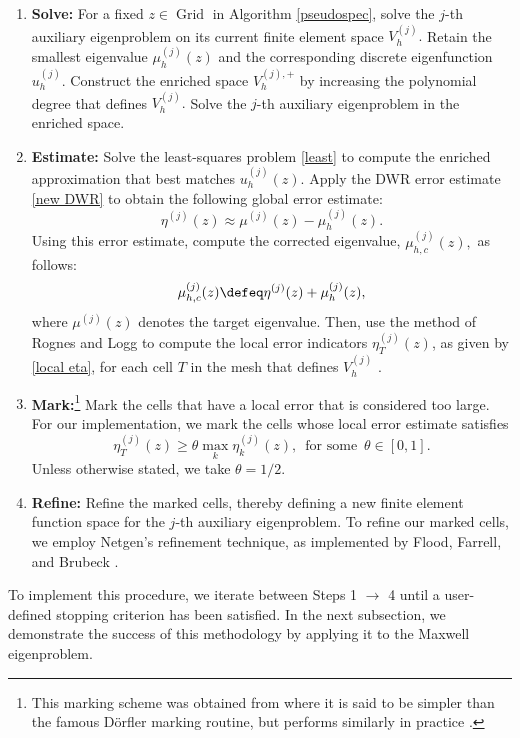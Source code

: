 \begin{enumerate}[label=\textbf{\arabic*}.] 
    \item \textbf{Solve:} For a fixed $z \in \operatorname{Grid}$ in Algorithm \ref{pseudospec},
    solve the $j$-th auxiliary eigenproblem on its current finite element space $V_h^{(j)}.$ Retain the smallest eigenvalue $\mu_h^{(j)}(z)$ and the corresponding discrete eigenfunction $u_h^{(j)}.$ Construct the enriched space $V_h^{(j), +}$ by increasing the polynomial degree that defines $V_h^{(j)}.$ Solve the $j$-th auxiliary eigenproblem in the enriched space.
    
    \item \textbf{Estimate:} Solve the least-squares problem \eqref{least} to compute the enriched approximation that best matches $u_h^{(j)}(z).$ Apply the DWR error estimate \eqref{new DWR} to obtain the following global error estimate:
    \begin{equation}
        \eta^{(j)}(z) \approx  \mu^{(j)}(z) - \mu_h^{(j)}(z).
    \end{equation}
    Using this error estimate, compute the corrected eigenvalue, $\mu_{h,c}^{(j)}(z),$  as follows:
    \begin{equation}
        \mu_{h,c}^{(j)}(z) \defeq \eta^{(j)}(z) + \mu_h^{(j)}(z),
    \end{equation}
    where $\mu^{(j)}(z)$ denotes the target eigenvalue. 
   Then, use the method of Rognes and Logg to compute the local error indicators $\eta_T^{(j)}(z)$, as given by \eqref{local eta}, for each cell $T$ in the mesh that defines $V_h^{(j)}$ \cite{logg, joe, pablo}. 

    
    \item \textbf{Mark:}\footnote{This marking scheme was obtained from \cite{Pslides} where it is said to be simpler than the famous Dörfler marking routine, but performs similarly in practice \cite{Dorf, Pslides}.} 
    Mark the cells that have a local error that is considered too large. For our implementation, we mark the cells whose local error estimate satisfies
    \begin{equation} \label{mark}
        \eta_T^{(j)}(z) \ge \theta \max_{k} \eta_k^{(j)}(z), \, \text{ for some } \, \theta \in [0,1].
    \end{equation}
    Unless otherwise stated, we take $\theta = 1/2.$

    
    \item \textbf{Refine:} Refine the marked cells, thereby defining a new finite element function space for the $j$-th auxiliary eigenproblem. To refine our marked cells, we employ Netgen's refinement technique, as implemented by Flood, Farrell, and Brubeck \cite{NGSolve, Schoberl1997, pablo}.

\end{enumerate}
To implement this procedure, we iterate between Steps 1 $\rightarrow$ 4 until a user-defined stopping criterion has been satisfied. In the next subsection, we demonstrate the success of this methodology by applying it to the Maxwell eigenproblem. 
% 



